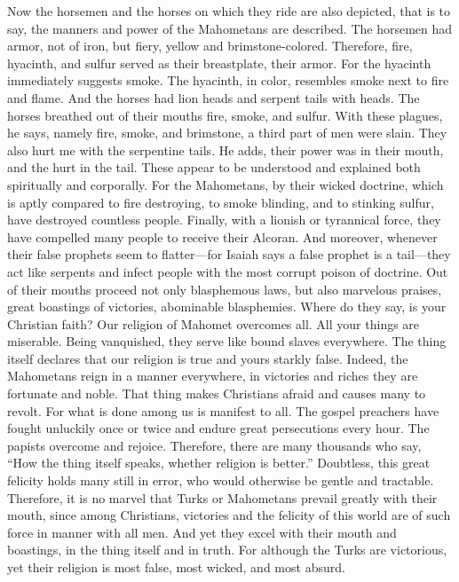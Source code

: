 Now the horsemen and the horses on which they ride are also depicted, that is to say, the manners and power of the Mahometans are described. The horsemen had armor, not of iron, but fiery, yellow and brimstone-colored. Therefore, fire, hyacinth, and sulfur served as their breastplate, their armor. For the hyacinth immediately suggests smoke. The hyacinth, in color, resembles smoke next to fire and flame. And the horses had lion heads and serpent tails with heads. The horses breathed out of their mouths fire, smoke, and sulfur. With these plagues, he says, namely fire, smoke, and brimstone, a third part of men were slain. They also hurt me with the serpentine tails. He adds, their power was in their mouth, and the hurt in the tail. These appear to be understood and explained both spiritually and corporally. For the Mahometans, by their wicked doctrine, which is aptly compared to fire destroying, to smoke blinding, and to stinking sulfur, have destroyed countless people. Finally, with a lionish or tyrannical force, they have compelled many people to receive their Alcoran. And moreover, whenever their false prophets seem to flatter—for Isaiah says a false prophet is a tail—they act like serpents and infect people with the most corrupt poison of doctrine. Out of their mouths proceed not only blasphemous laws, but also marvelous praises, great boastings of victories, abominable blasphemies. Where do they say, is your Christian faith? Our religion of Mahomet overcomes all. All your things are miserable. Being vanquished, they serve like bound slaves everywhere. The thing itself declares that our religion is true and yours starkly false. Indeed, the Mahometans reign in a manner everywhere, in victories and riches they are fortunate and noble. That thing makes Christians afraid and causes many to revolt. For what is done among us is manifest to all. The gospel preachers have fought unluckily once or twice and endure great persecutions every hour. The papists overcome and rejoice. Therefore, there are many thousands who say, “How the thing itself speaks, whether religion is better.” Doubtless, this great felicity holds many still in error, who would otherwise be gentle and tractable. Therefore, it is no marvel that Turks or Mahometans prevail greatly with their mouth, since among Christians, victories and the felicity of this world are of such force in manner with all men. And yet they excel with their mouth and boastings, in the thing itself and in truth. For although the Turks are victorious, yet their religion is most false, most wicked, and most absurd.

